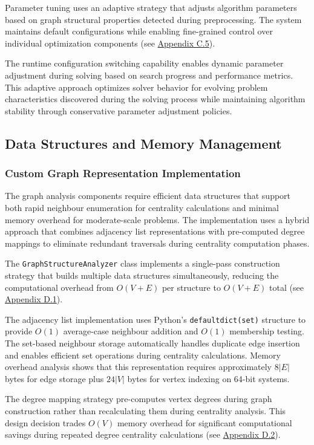 Parameter tuning uses an adaptive strategy that adjusts algorithm parameters based on graph structural properties detected during preprocessing. The system maintains default configurations while enabling fine-grained control over individual optimization components (see \hyperref[appendix:config-management]{Appendix C.5}).

The runtime configuration switching capability enables dynamic parameter adjustment during solving based on search progress and performance metrics. This adaptive approach optimizes solver behavior for evolving problem characteristics discovered during the solving process while maintaining algorithm stability through conservative parameter adjustment policies.

\subsection{Data Structures and Memory Management}

\subsubsection{Custom Graph Representation Implementation}

The graph analysis components require efficient data structures that support both rapid neighbour enumeration for centrality calculations and minimal memory overhead for moderate-scale problems. The implementation uses a hybrid approach that combines adjacency list representations with pre-computed degree mappings to eliminate redundant traversals during centrality computation phases.

The \texttt{GraphStructureAnalyzer} class implements a single-pass construction strategy that builds multiple data structures simultaneously, reducing the computational overhead from $O(V+E)$ per structure to $O(V+E)$ total (see \hyperref[appendix:graph-construction]{Appendix D.1}).

The adjacency list implementation uses Python's \texttt{defaultdict(set)} structure to provide $O(1)$ average-case neighbour addition and $O(1)$ membership testing. The set-based neighbour storage automatically handles duplicate edge insertion and enables efficient set operations during centrality calculations. Memory overhead analysis shows that this representation requires approximately $8|E|$ bytes for edge storage plus $24|V|$ bytes for vertex indexing on 64-bit systems.

The degree mapping strategy pre-computes vertex degrees during graph construction rather than recalculating them during centrality analysis. This design decision trades $O(V)$ memory overhead for significant computational savings during repeated degree centrality calculations (see \hyperref[appendix:degree-centrality]{Appendix D.2}).

